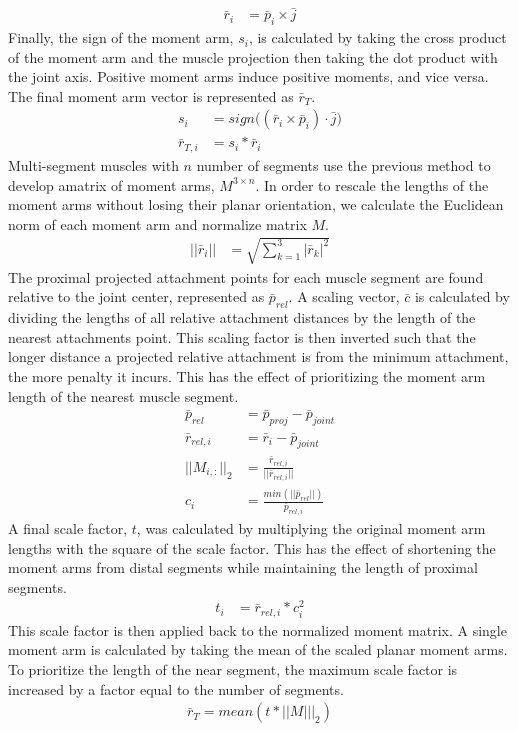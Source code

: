 \documentclass[runningheads,a4paper]{llncs}
\begin{document}
				\begin{align}
					\bar{r}_{i} &= \bar{p}_{i} \times \bar{j}
				\end{align}
		Finally, the sign of the moment arm, $s_{i}$, is calculated by taking the cross product of the moment arm and the muscle projection then taking the dot product with the joint axis. Positive moment arms induce positive moments, and vice versa. The final moment arm vector is represented as $\bar{r}_{T}$.
		\begin{align}
			s_{i} &= sign\big((\bar{r}_{i} \times \bar{p}_{i}) \cdot \bar{j}\big) \\
			\bar{r}_{T,i} &= s_{i}*\bar{r}_{i}
		\end{align}
		Multi-segment muscles with $n$ number of segments use the previous method to develop amatrix of moment arms, $M^{3 \times n}$. In order to rescale the lengths of the moment arms without losing their planar orientation, we calculate the Euclidean norm of each moment arm and normalize matrix $M$.
		\begin{align}
			||\bar{r}_{i}|| &= \sqrt{\sum_{k=1}^{3}|\bar{r}_{k}|^2}	
		\end{align}
		The proximal projected attachment points for each muscle segment are found relative to the joint center, represented as $\bar{p}_{rel}$. A scaling vector, $\bar{c}$ is calculated by dividing the lengths of all relative attachment distances by the length of the nearest attachments point. This scaling factor is then inverted such that the longer distance a projected relative attachment is from the minimum attachment, the more penalty it incurs. This has the effect of prioritizing the moment arm length of the nearest muscle segment.
		\begin{align}
			\bar{p}_{rel} &= \bar{p}_{proj} - \bar{p}_{joint} \\
			\bar{r}_{rel,i} &= \bar{r}_{i} - \bar{p}_{joint} \\
			||M_{i,:}||_{2} &= \frac{\bar{r}_{rel,i}}{||\bar{r}_{rel,i}||} \\
			c_{i} &= \frac{min(||\bar{p}_{rel}||)}{\bar{p}_{rel,i}}
		\end{align}
		A final scale factor, $t$, was calculated by multiplying the original moment arm lengths with the square of the scale factor. This has the effect of shortening the moment arms from distal segments while maintaining the length of proximal segments.
		\begin{align}
			t_{i} &= \bar{r}_{rel,i}*c_{i}^2
		\end{align}
		This scale factor is then applied back to the normalized moment matrix. A single moment arm is calculated by taking the mean of the scaled planar moment arms. To prioritize the length of the near segment, the maximum scale factor is increased by a factor equal to the number of segments.
		\begin{align}
			\bar{r}_{T} = mean(t*||M|||_{2}) 
		\end{align} 
		\FloatBarrier
		
		 
		
		
\end{document}
